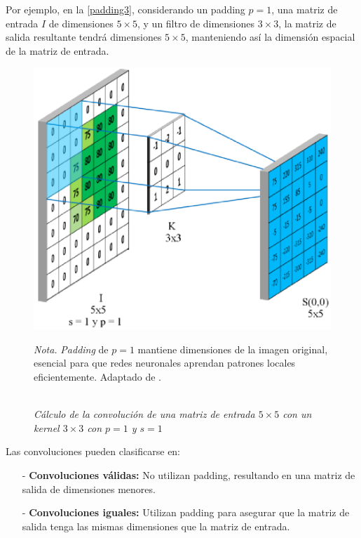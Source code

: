                     Por ejemplo, en la \autoref{padding3}, considerando un padding \( p = 1 \), una matriz de entrada \( I \) de dimensiones \( 5 \times 5 \), y un filtro de dimensiones \( 3 \times 3 \), la matriz de salida resultante tendrá dimensiones \( 5 \times 5 \), manteniendo así la dimensión espacial de la matriz de entrada.

    
                    \begin{figure}[H] 
                        \caption{\doublespacing \\ \textit{Cálculo de la convolución de una matriz de entrada \( 5 \times 5 \) con un kernel \( 3 \times 3 \) con \( p = 1 \) y \( s = 1 \)}} 
                        \centering
                        \includegraphics[width=1\linewidth]{2_CAPITULO0/IMG/padding3.png}
                        \begin{justify}
                            \textit{Nota.} \textit{Padding} de \( p=1 \) mantiene dimensiones de la imagen original, esencial para que redes neuronales aprendan patrones locales eficientemente. Adaptado de \textcite{Goodfellow2016}.
                        \end{justify}                    
                        \label{padding3}
                    \end{figure}

                    Las convoluciones pueden clasificarse en:
                    
                    \begin{itemize}
                        \item[-] \textbf{Convoluciones válidas:} No utilizan padding, resultando en una matriz de salida de dimensiones menores.
                        \item[-] \textbf{Convoluciones iguales:} Utilizan padding para asegurar que la matriz de salida tenga las mismas dimensiones que la matriz de entrada.
                    \end{itemize}
                    
